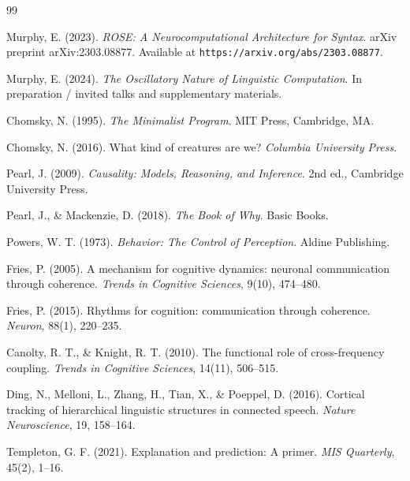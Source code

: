 \documentclass[11pt]{article}
\begin{document}
\begin{thebibliography}{99}

Murphy, E. (2023).
\newblock \emph{ROSE: A Neurocomputational Architecture for Syntax}.
\newblock arXiv preprint arXiv:2303.08877.
\newblock Available at \texttt{https://arxiv.org/abs/2303.08877}.

Murphy, E. (2024).
\newblock \emph{The Oscillatory Nature of Linguistic Computation}.
\newblock In preparation / invited talks and supplementary materials.

Chomsky, N. (1995).
\newblock \emph{The Minimalist Program}.
\newblock MIT Press, Cambridge, MA.

Chomsky, N. (2016).
\newblock What kind of creatures are we?
\newblock \emph{Columbia University Press}.

Pearl, J. (2009).
\newblock \emph{Causality: Models, Reasoning, and Inference}.
\newblock 2nd ed., Cambridge University Press.

Pearl, J., \& Mackenzie, D. (2018).
\newblock \emph{The Book of Why}.
\newblock Basic Books.

Powers, W. T. (1973).
\newblock \emph{Behavior: The Control of Perception}.
\newblock Aldine Publishing.

Fries, P. (2005).
\newblock A mechanism for cognitive dynamics: neuronal communication through coherence.
\newblock \emph{Trends in Cognitive Sciences}, 9(10), 474--480.

Fries, P. (2015).
\newblock Rhythms for cognition: communication through coherence.
\newblock \emph{Neuron}, 88(1), 220--235.

Canolty, R. T., \& Knight, R. T. (2010).
\newblock The functional role of cross-frequency coupling.
\newblock \emph{Trends in Cognitive Sciences}, 14(11), 506--515.

Ding, N., Melloni, L., Zhang, H., Tian, X., \& Poeppel, D. (2016).
\newblock Cortical tracking of hierarchical linguistic structures in connected speech.
\newblock \emph{Nature Neuroscience}, 19, 158--164.

Templeton, G. F. (2021).
\newblock Explanation and prediction: A primer.
\newblock \emph{MIS Quarterly}, 45(2), 1--16.


\end{thebibliography}
\end{document}
